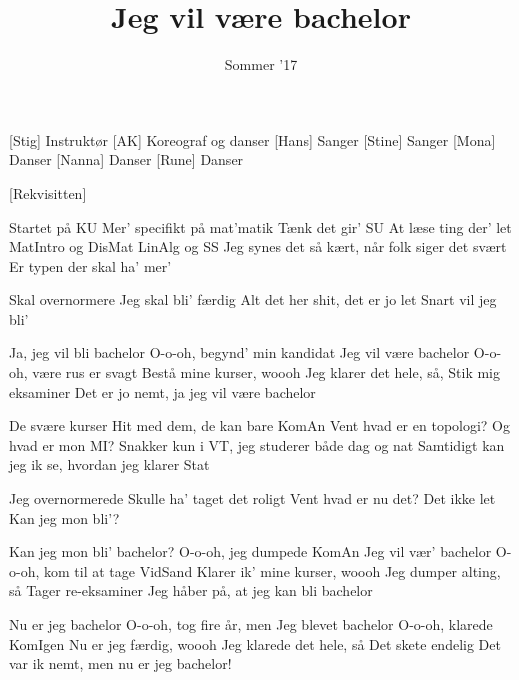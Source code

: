 \documentclass[a4paper,11pt]{article}
\title{Jeg vil være bachelor}
\author{Sommer '17}
\begin{document}
\maketitle

\begin{roles}
[Stig] Instruktør
[AK] Koreograf og danser
[Hans] Sanger
[Stine] Sanger
[Mona] Danser
[Nanna] Danser
[Rune] Danser
\end{roles}

\begin{props}
[Rekvisitten]
\end{props}


\begin{song}
%
Startet på KU
Mer' specifikt på mat'matik
Tænk det gir' SU
At læse ting der' let
MatIntro og DisMat
LinAlg og SS
Jeg synes det så kært, når folk siger det svært
Er typen der skal ha' mer'

%
Skal overnormere
Jeg skal bli' færdig
Alt det her shit, det er jo let
Snart vil jeg bli'

%
Ja, jeg vil bli bachelor
O-o-oh, begynd' min kandidat
Jeg vil være bachelor
O-o-oh, være rus er svagt
Bestå mine kurser, woooh
Jeg klarer det hele, så,
Stik mig eksaminer
Det er jo nemt, ja jeg vil være bachelor

%
De svære kurser
Hit med dem, de kan bare KomAn
Vent hvad er en topologi?
Og hvad er mon MI?
Snakker kun i VT, jeg studerer både dag og nat
Samtidigt kan jeg ik se, hvordan jeg klarer Stat

%
Jeg overnormerede
Skulle ha' taget det roligt
Vent hvad er nu det? Det ikke let
Kan jeg mon bli'?

%
Kan jeg mon bli' bachelor?
O-o-oh, jeg dumpede KomAn
Jeg vil vær' bachelor
O-o-oh, kom til at tage VidSand
Klarer ik' mine kurser, woooh
Jeg dumper alting, så
Tager re-eksaminer
Jeg håber på, at jeg kan bli bachelor

%
Nu er jeg bachelor
O-o-oh, tog fire år, men
Jeg blevet bachelor
O-o-oh, klarede KomIgen
Nu er jeg færdig, woooh
Jeg klarede det hele, så
Det skete endelig
Det var ik nemt, men nu er jeg bachelor!
\end{song}
\end{document}
